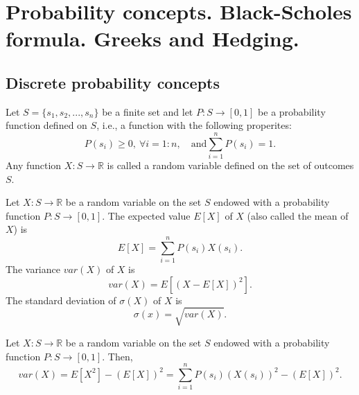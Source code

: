 \chapter{Probability concepts. Black-Scholes formula. Greeks and Hedging.}

\section{Discrete probability concepts}
Let $ S = \{ s_1, s_2, ..., s_n \} $ be a finite set and let
    $ P : S \rightarrow [0, 1] $ be a probability function defined on $ S $,
    i.e., a function with the following properites:
\begin{equation}
    P(s_i) \geq 0,\ \forall i = 1 : n, \quad \text{and}
        \sum_{i=1}^{n} P(s_i) = 1.
    \label{eq:probability-distribution}
\end{equation}
Any function $ X : S \rightarrow \mathbb{R} $ is called a random variable
    defined on the set of outcomes $ S $.

\begin{definition}
    Let $ X : S \rightarrow \mathbb{R} $ be a random variable on the set $ S $
        endowed with a probability function $ P : S \rightarrow [0, 1] $.
    The expected value $ E[X] $ of $ X $ (also called the mean of $ X $) is
    \begin{equation}
        E[X] = \sum_{i=1}^{n} P(s_i) X(s_i).
        \label{eq:expected-value}
    \end{equation}
    The variance $ var(X) $ of $ X $ is
    \begin{equation}
        var(X) = E[(X - E[X])^2].
        \label{eq:variance}
    \end{equation}
    The standard deviation of $ \sigma(X) $ of $ X $ is
    \begin{equation}
        \sigma(x) = \sqrt{var(X)}.
        \label{eq:standard-deviation}
    \end{equation}
\end{definition}

\begin{lemma}
    Let $ X : S \rightarrow \mathbb{R} $ be a random variable on the set $ S $
        endowed with a probability function $ P : S \rightarrow [0, 1] $.
    Then,
    \begin{equation*}
        var(X) = E[X^2] - (E[X])^2 = \sum_{i=1}^{n} P(s_i) (X(s_i))^2 -
            (E[X])^2.
    \end{equation*}
\end{lemma}

